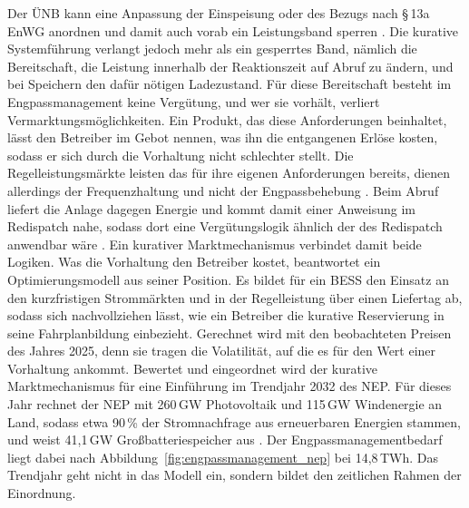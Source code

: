 Der \ac{ÜNB} kann eine Anpassung der Einspeisung oder des Bezugs nach §\,13a \ac{EnWG} anordnen und damit auch vorab ein Leistungsband sperren \cite{bundesministerium_der_justiz_energiewirtschaftsgesetz_2025}.
Die kurative Systemführung verlangt jedoch mehr als ein gesperrtes Band, nämlich die Bereitschaft, die Leistung innerhalb der Reaktionszeit auf Abruf zu ändern, und bei Speichern den dafür nötigen Ladezustand.
Für diese Bereitschaft besteht im Engpassmanagement keine Vergütung, und wer sie vorhält, verliert Vermarktungsmöglichkeiten.
Ein Produkt, das diese Anforderungen beinhaltet, lässt den Betreiber im Gebot nennen, was ihn die entgangenen Erlöse kosten, sodass er sich durch die Vorhaltung nicht schlechter stellt.
Die Regelleistungsmärkte leisten das für ihre eigenen Anforderungen bereits, dienen allerdings der Frequenzhaltung und nicht der Engpassbehebung \cite{ubertragungsnetzbetreiber_deutschland_praqualifikationsverfahren_2024}.
Beim Abruf liefert die Anlage dagegen Energie und kommt damit einer Anweisung im Redispatch nahe, sodass dort eine Vergütungslogik ähnlich der des Redispatch anwendbar wäre \cite{bundesnetzagentur_festlegung_2024}.
Ein kurativer Marktmechanismus verbindet damit beide Logiken.
Was die Vorhaltung den Betreiber kostet, beantwortet ein Optimierungsmodell aus seiner Position.
Es bildet für ein \ac{BESS} den Einsatz an den kurzfristigen Strommärkten und in der Regelleistung über einen Liefertag ab, sodass sich nachvollziehen lässt, wie ein Betreiber die kurative Reservierung in seine Fahrplanbildung einbezieht.
Gerechnet wird mit den beobachteten Preisen des Jahres 2025, denn sie tragen die Volatilität, auf die es für den Wert einer Vorhaltung ankommt.
Bewertet und eingeordnet wird der kurative Marktmechanismus für eine Einführung im Trendjahr 2032 des \ac{NEP}.
Für dieses Jahr rechnet der \ac{NEP} mit 260\,\si{GW} Photovoltaik und 115\,\si{GW} Windenergie an Land, sodass etwa 90\,\% der Stromnachfrage aus erneuerbaren Energien stammen, und weist 41{,}1\,\si{GW} Großbatteriespeicher aus \cite{bundesnetzagentur_netzentwicklungsplan_2026}.
Der Engpassmanagementbedarf liegt dabei nach Abbildung~\ref{fig:engpassmanagement_nep} bei 14{,}8\,\si{TWh}.
Das Trendjahr geht nicht in das Modell ein, sondern bildet den zeitlichen Rahmen der Einordnung.

